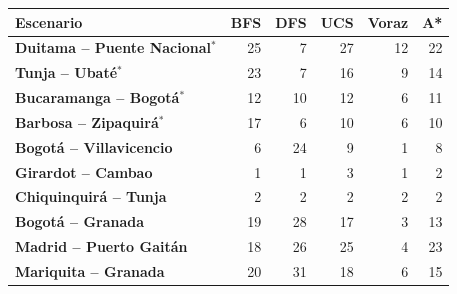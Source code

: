 \renewcommand{\arraystretch}{1.2}
\begin{tabular}{|l|r|r|r|r|r|}
\hline
\rowcolor{gray!20} \textbf{Escenario} & \textbf{BFS} & \textbf{DFS} & \textbf{UCS} & \textbf{Voraz} & \textbf{A*} \\
\hline
\textbf{Duitama -- Puente Nacional$^{*}$} & 25 & 7 & 27 & 12 & 22 \\
\hline
\textbf{Tunja -- Ubaté$^{*}$} & 23 & 7 & 16 & 9 & 14 \\
\hline
\textbf{Bucaramanga -- Bogotá$^{*}$} & 12 & 10 & 12 & 6 & 11 \\
\hline
\textbf{Barbosa -- Zipaquirá$^{*}$} & 17 & 6 & 10 & 6 & 10 \\
\hline
\textbf{Bogotá -- Villavicencio} & 6 & 24 & 9 & 1 & 8 \\
\hline
\textbf{Girardot -- Cambao} & 1 & 1 & 3 & 1 & 2 \\
\hline
\textbf{Chiquinquirá -- Tunja} & 2 & 2 & 2 & 2 & 2 \\
\hline
\textbf{Bogotá -- Granada} & 19 & 28 & 17 & 3 & 13 \\
\hline
\textbf{Madrid -- Puerto Gaitán} & 18 & 26 & 25 & 4 & 23 \\
\hline
\textbf{Mariquita -- Granada} & 20 & 31 & 18 & 6 & 15 \\
\hline
\end{tabular}
